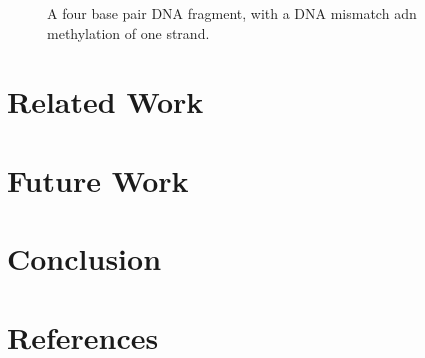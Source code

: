 \documentclass[review]{elsarticle}
\begin{document}
\begin{figure}[h!]
  \centering
  \caption[A three base pair DNA fragment.]{A four base pair DNA fragment, with a DNA mismatch adn methylation of one strand.}
  \label{fig:state1}
\end{figure}

\section{Related Work}

\section{Future Work}

\section{Conclusion}

\section*{References}


\end{document}
